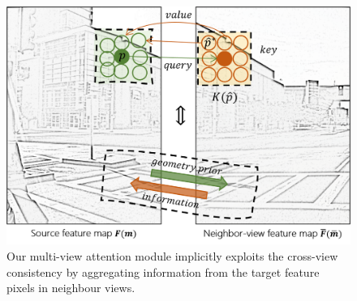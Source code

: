 \begin{figure}[ht]
\centering
\includegraphics[width=0.9\linewidth]{figures/cross_view_attention.png}
\caption{Our multi-view attention module implicitly exploits the cross-view consistency by aggregating information from the target feature pixels in neighbour views.
}
\label{fig:cross_view}
\end{figure}


